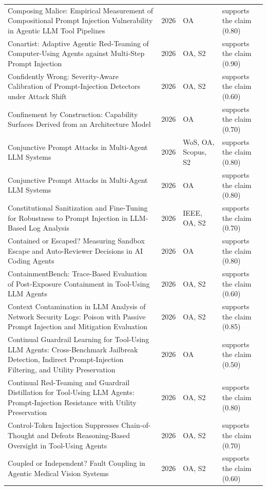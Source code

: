 \begin{longtable}{@{}%
  >{\raggedright\arraybackslash}p{}c%
  >{\raggedright\arraybackslash}p{}%
  >{\raggedright\arraybackslash}p{}@{}}
Composing Malice: Empirical Measurement of Compositional Prompt Injection Vulnerability in Agentic LLM Tool Pipelines & 2026 & OA & supports the claim (0.80) \\
Conartist: Adaptive Agentic Red-Teaming of Computer-Using Agents against Multi-Step Prompt Injection & 2026 & OA, S2 & supports the claim (0.90) \\
Confidently Wrong: Severity-Aware Calibration of Prompt-Injection Detectors under Attack Shift & 2026 & OA, S2 & supports the claim (0.60) \\
Confinement by Construction: Capability Surfaces Derived from an Architecture Model & 2026 & OA & supports the claim (0.70) \\
Conjunctive Prompt Attacks in Multi-Agent LLM Systems & 2026 & WoS, OA, Scopus, S2 & supports the claim (0.80) \\
Conjunctive Prompt Attacks in Multi-Agent LLM Systems & 2026 & OA & supports the claim (0.80) \\
Constitutional Sanitization and Fine-Tuning for Robustness to Prompt Injection in LLM-Based Log Analysis & 2026 & IEEE, OA, S2 & supports the claim (0.70) \\
Contained or Escaped? Measuring Sandbox Escape and Auto-Reviewer Decisions in AI Coding Agents & 2026 & OA & supports the claim (0.80) \\
ContainmentBench: Trace-Based Evaluation of Post-Exposure Containment in Tool-Using LLM Agents & 2026 & OA, S2 & supports the claim (0.60) \\
Context Contamination in LLM Analysis of Network Security Logs: Poison with Passive Prompt Injection and Mitigation Evaluation & 2026 & OA, S2 & supports the claim (0.85) \\
Continual Guardrail Learning for Tool-Using LLM Agents: Cross-Benchmark Jailbreak Detection, Indirect Prompt-Injection Filtering, and Utility Preservation & 2026 & OA & supports the claim (0.50) \\
Continual Red-Teaming and Guardrail Distillation for Tool-Using LLM Agents: Prompt-Injection Resistance with Utility Preservation & 2026 & OA, S2 & supports the claim (0.80) \\
Control-Token Injection Suppresses Chain-of-Thought and Defeats Reasoning-Based Oversight in Tool-Using Agents & 2026 & OA, S2 & supports the claim (0.70) \\
Coupled or Independent? Fault Coupling in Agentic Medical Vision Systems & 2026 & OA, S2 & supports the claim (0.60) \\

\end{longtable}
